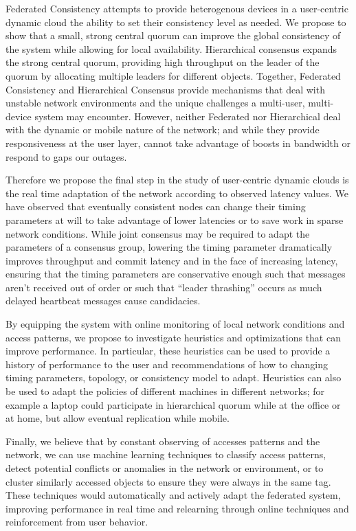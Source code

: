 \documentclass{article}
\begin{document}
Federated Consistency attempts to provide heterogenous devices in a user-centric dynamic cloud the ability to set their consistency level as needed. We propose to show that a small, strong central quorum can improve the global consistency of the system while allowing for local availability. Hierarchical consensus expands the strong central quorum, providing high throughput on the leader of the quorum by allocating multiple leaders for different objects. Together, Federated Consistency and Hierarchical Consensus provide mechanisms that deal with unstable network environments and the unique challenges a multi-user, multi-device system may encounter. However, neither Federated nor Hierarchical deal with the dynamic or mobile nature of the network; and while they provide responsiveness at the user layer, cannot take advantage of boosts in bandwidth or respond to gaps our outages.

Therefore we propose the final step in the study of user-centric dynamic clouds is the real time adaptation of the network according to observed latency values. We have observed that eventually consistent nodes can change their timing parameters at will to take advantage of lower latencies or to save work in sparse network conditions. While joint consensus may be required to adapt the parameters of a consensus group, lowering the timing parameter dramatically improves throughput and commit latency and in the face of increasing latency, ensuring that the timing parameters are conservative enough such that messages aren't received out of order or such that ``leader thrashing'' occurs as much delayed heartbeat messages cause candidacies.

By equipping the system with online monitoring of local network conditions and access patterns, we propose to investigate heuristics and optimizations that can improve performance. In particular, these heuristics can be used to provide a history of performance to the user and recommendations of how to changing timing parameters, topology, or consistency model to adapt. Heuristics can also be used to adapt the policies of different machines in different networks; for example a laptop could participate in hierarchical quorum while at the office or at home, but allow eventual replication while mobile.

Finally, we believe that by constant observing of accesses patterns and the network, we can use machine learning techniques to classify access patterns, detect potential conflicts or anomalies in the network or environment, or to cluster similarly accessed objects to ensure they were always in the same tag. These techniques would automatically and actively adapt the federated system, improving performance in real time and relearning through online techniques and reinforcement from user behavior.
\end{document}
